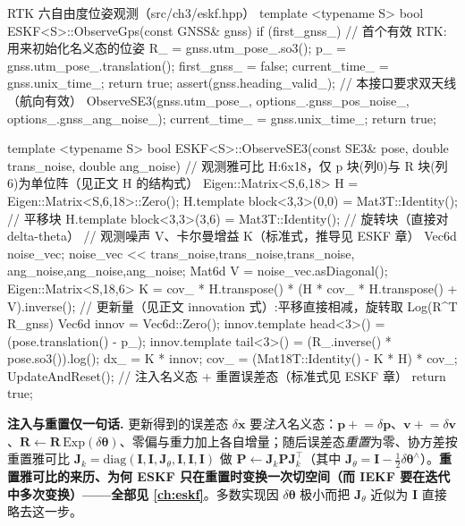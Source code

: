 \begin{codebox}[C++]{RTK 六自由度位姿观测（src/ch3/eskf.hpp）}
template <typename S>
bool ESKF<S>::ObserveGps(const GNSS& gnss) {
  if (first_gnss_) {                          // 首个有效 RTK:用来初始化名义态的位姿
    R_ = gnss.utm_pose_.so3();
    p_ = gnss.utm_pose_.translation();
    first_gnss_ = false; current_time_ = gnss.unix_time_;
    return true;
  }
  assert(gnss.heading_valid_);                // 本接口要求双天线（航向有效）
  ObserveSE3(gnss.utm_pose_, options_.gnss_pos_noise_, options_.gnss_ang_noise_);
  current_time_ = gnss.unix_time_;
  return true;
}

template <typename S>
bool ESKF<S>::ObserveSE3(const SE3& pose, double trans_noise, double ang_noise) {
  // 观测雅可比 H:6x18，仅 p 块(列0)与 R 块(列6)为单位阵（见正文 H 的结构式）
  Eigen::Matrix<S,6,18> H = Eigen::Matrix<S,6,18>::Zero();
  H.template block<3,3>(0,0) = Mat3T::Identity();   // 平移块
  H.template block<3,3>(3,6) = Mat3T::Identity();   // 旋转块（直接对 delta-theta）
  // 观测噪声 V、卡尔曼增益 K（标准式，推导见 ESKF 章）
  Vec6d noise_vec; noise_vec << trans_noise,trans_noise,trans_noise, ang_noise,ang_noise,ang_noise;
  Mat6d V = noise_vec.asDiagonal();
  Eigen::Matrix<S,18,6> K = cov_ * H.transpose() * (H * cov_ * H.transpose() + V).inverse();
  // 更新量（见正文 innovation 式）:平移直接相减，旋转取 Log(R^T R_gnss)
  Vec6d innov = Vec6d::Zero();
  innov.template head<3>() = (pose.translation() - p_);
  innov.template tail<3>() = (R_.inverse() * pose.so3()).log();
  dx_  = K * innov;
  cov_ = (Mat18T::Identity() - K * H) * cov_;
  UpdateAndReset();      // 注入名义态 + 重置误差态（标准式见 ESKF 章）
  return true;
}
\end{codebox}

\begin{note}
\textbf{注入与重置仅一句话.}\;
更新得到的误差态 $\delta\mathbf{x}$ 要\emph{注入}名义态：$\mathbf{p}\!\mathrel{+}=\!\delta\mathbf{p}$、$\mathbf{v}\!\mathrel{+}=\!\delta\mathbf{v}$、$\mathbf{R}\!\leftarrow\!\mathbf{R}\,\mathrm{Exp}(\delta\boldsymbol{\theta})$、零偏与重力加上各自增量；随后误差态\emph{重置}为零、协方差按重置雅可比 $\mathbf{J}_k=\mathrm{diag}(\mathbf{I},\mathbf{I},\mathbf{J}_\theta,\mathbf{I},\mathbf{I},\mathbf{I})$ 做 $\mathbf{P}\!\leftarrow\!\mathbf{J}_k\mathbf{P}\mathbf{J}_k^\top$（其中 $\mathbf{J}_\theta=\mathbf{I}-\tfrac12\delta\boldsymbol{\theta}^\wedge$）。\textbf{重置雅可比的来历、为何 ESKF 只在重置时变换一次切空间（而 IEKF 要在迭代中多次变换）——全部见 \cref{ch:eskf}}\cite{gao2023slamad}。多数实现因 $\delta\boldsymbol{\theta}$ 极小而把 $\mathbf{J}_\theta$ 近似为 $\mathbf{I}$ 直接略去这一步。
\end{note}

